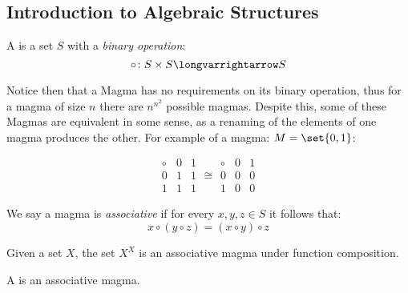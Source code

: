 \documentclass[10pt]{article}
\begin{document}


\bigskip

\subsection{Introduction to Algebraic Structures}

\begin{defn*}

    A  is a set $S$ with a \emph{binary operation}:
        \[ \circ\colon S\times S\longvarrightarrow S \]

\end{defn*}

Notice then that a Magma has no requirements on its binary operation, thus for a magma of size $n$ there are $n^{n^2}$ possible magmas.
Despite this, some of these Magmas are equivalent in some sense, as a renaming of the elements of one magma produces the other.
For example of a magma: $M=\set{0, 1}$:

\[ \begin{array}{c|cc} \circ & 0 & 1 \\\hline 0 & 1 & 1 \\ 1 & 1 & 1 \end{array} \cong
   \begin{array}{c|cc} \circ & 0 & 1 \\\hline 0 & 0 & 0 \\ 1 & 0 & 0 \end{array} \]

We say a magma is \emph{associative} if for every $x,y,z\in S$ it follows that:
\[ x\circ(y\circ z) = (x\circ y)\circ z \]

\begin{exam}

    Given a set $X$, the set $X^{X}$ is an associative magma under function composition.

\end{exam}

\begin{defn*}

    A  is an associative magma.

\end{defn*}
\end{document}
